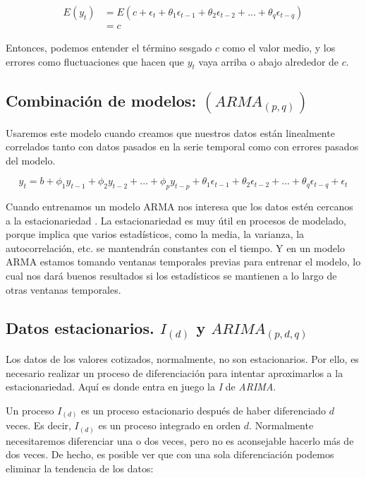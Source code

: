 \begin{equation}
\begin{aligned}
	E(y_{t}) &= E(c + \epsilon_{t} + \theta_{1}\epsilon_{t-1} + \theta_{2}\epsilon_{t-2} + ... + \theta_{q}\epsilon_{t-q}) \\ 
	&= c
\end{aligned}
\end{equation}

Entonces, podemos entender el término sesgado $c$ como el valor medio, y los errores como fluctuaciones que hacen que $y_{t}$ vaya arriba o abajo alrededor de $c$. 


\subsection{Combinación de modelos: $(ARMA_{(p, q)})$}

Usaremos este modelo cuando creamos que nuestros datos están linealmente correlados tanto con datos pasados en la serie temporal como con errores pasados del modelo. 

\begin{equation}
	y_{t} = b + \phi_{1}y_{t-1} + \phi_{2}y_{t-2} + ... + \phi_{p}y_{t-p} + \theta_{1}\epsilon_{t-1} + \theta_{2}\epsilon_{t-2} + ... + \theta_{q}\epsilon_{t-q} + \epsilon_{t}
\end{equation}

Cuando entrenamos un modelo ARMA nos interesa que los datos estén cercanos a la estacionariedad \citep{wiki:proceso_estacionario}. La estacionariedad es muy útil en procesos de modelado, porque implica que varios estadísticos, como la media, la varianza, la autocorrelación, etc. se mantendrán constantes con el tiempo. Y en un modelo ARMA estamos tomando ventanas temporales previas para entrenar el modelo, lo cual nos dará buenos resultados si los estadísticos se mantienen a lo largo de otras ventanas temporales. 


\subsection{Datos estacionarios. $I_{(d)}$ y $ARIMA_{(p, d, q)}$}

Los datos de los valores cotizados, normalmente, no son estacionarios. Por ello, es necesario realizar un proceso de diferenciación para intentar aproximarlos a la estacionariedad. Aquí es donde entra en juego la \emph{I} de \emph{ARIMA}. 

Un proceso $I_{(d)}$ es un proceso estacionario después de haber diferenciado $d$ veces. Es decir, $I_{(d)}$ es un proceso integrado en orden $d$. Normalmente necesitaremos diferenciar una o dos veces, pero no es aconsejable hacerlo más de dos veces. De hecho, es posible ver que con una sola diferenciación podemos eliminar la tendencia de los datos:

